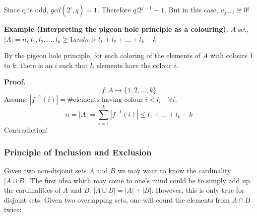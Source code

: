 Since q is odd, $gcd(2^i, q)=1$. Therefore $q | 2^{j-1} - 1$. But in this case, $a_{j-i}\cong 0$!


\textbf{Example (Interpreting the pigeon hole principle as a colouring).}
$A$ set, $|A| = n$,
$l_1, l_2, \ldots, l_k ≥ 1 and n > l_1 + l_2 + \ldots + l_k - k$

By the pigeon hole principle, for each coloring of the elements of $A$ with colours 1 to $k$, there is an $i$ such that $l_i$ elements have the colour $i$.

\textbf{Proof.}
\[
  f: A\mapsto \{1,2,\ldots,k\}
\]
Assume
  $|f^{-1}(i)| = \text{\#elements having colour $i$} < l_i
  \quad\forall i$.
\[
  n = |A| = \sum_{i=1}^k |f^{-1}(i)| ≤ l_1 +\ldots + l_k - k
\]
Contradiction!


\subsubsection{Principle of Inclusion and Exclusion}

Given two non-disjoint sets $A$ and $B$  we may want to know the cardinality $|A \cup B|$.
The first idea which may come to one's mind could be to simply add up the cardinalities of $A$ and $B$:
$|A \cup B| = |A| + |B|$. However, this
is only true for disjoint sets. Given two overlapping sets, one will count the elements from
$A \cap B$ twice:

